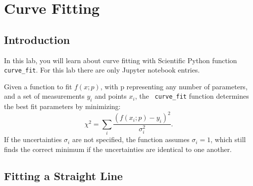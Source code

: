 \chapter{Curve Fitting}



\section{Introduction}

In this lab, you will learn about curve fitting with Scientific Python
function {\tt curve{\_}fit}.  For this lab there are only Jupyter notebook entries. 

Given a function to fit $f(x;p)$, with p representing any number of
parameters, and a set of measurements $y_i$ and points $x_i$, the {\tt
  curve{\_}fit} function determines the best fit parameters by
minimizing:
\begin{equation}
\chi^2 = \sum_i \frac{(f(x_i;p) - y_i) ^2}{\sigma_i^2}.
\label{eqn:chi2}
\end{equation}
If the uncertainties $\sigma_i$ are not specified, the function
assumes $\sigma_i = 1$, which still finds the correct minimum
if the uncertainties are identical to one another.

\section{Fitting a Straight Line}

